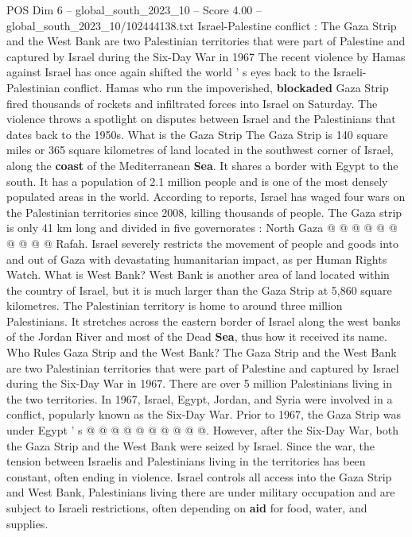 \begin{textsample}{POS Dim 6 – global\_south\_2023\_10 – Score 4.00 – global\_south\_2023\_10/102444138.txt}  \label{ex:f6_pos_296}
Israel-Palestine conflict : The Gaza Strip and the West Bank are two Palestinian territories that were part of Palestine and captured by Israel during the Six-Day War in 1967 The recent violence by Hamas against Israel has once again shifted the world ' s eyes back to the Israeli-Palestinian conflict.
Hamas who run the impoverished, \textbf{blockaded} Gaza Strip fired thousands of rockets and infiltrated forces into Israel on Saturday.
The violence throws a spotlight on disputes between Israel and the Palestinians that dates back to the 1950s.
What is the Gaza Strip The Gaza Strip is 140 square miles or 365 square kilometres of land located in the southwest corner of Israel, along the \textbf{coast} of the Mediterranean \textbf{Sea}.
It shares a border with Egypt to the south.
It has a population of 2.1 million people and is one of the most densely populated areas in the world.
According to reports, Israel has waged four wars on the Palestinian territories since 2008, killing thousands of people.
The Gaza strip is only 41 km long and divided in five governorates : North Gaza @ @ @ @ @ @ @ @ @ @ Rafah.
Israel severely restricts the movement of people and goods into and out of Gaza with devastating humanitarian impact, as per Human Rights Watch.
What is West Bank?
West Bank is another area of land located within the country of Israel, but it is much larger than the Gaza Strip at 5,860 square kilometres.
The Palestinian territory is home to around three million Palestinians.
It stretches across the eastern border of Israel along the west banks of the Jordan River and most of the Dead \textbf{Sea}, thus how it received its name.
Who Rules Gaza Strip and the West Bank?
The Gaza Strip and the West Bank are two Palestinian territories that were part of Palestine and captured by Israel during the Six-Day War in 1967.
There are over 5 million Palestinians living in the two territories.
In 1967, Israel, Egypt, Jordan, and Syria were involved in a conflict, popularly known as the Six-Day War.
Prior to 1967, the Gaza Strip was under Egypt ' s @ @ @ @ @ @ @ @ @ @.
However, after the Six-Day War, both the Gaza Strip and the West Bank were seized by Israel.
Since the war, the tension between Israelis and Palestinians living in the territories has been constant, often ending in violence.
Israel controls all access into the Gaza Strip and West Bank, Palestinians living there are under military occupation and are subject to Israeli restrictions, often depending on \textbf{aid} for food, water, and supplies.

\end{textsample}
